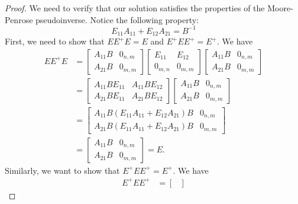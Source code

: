 \documentclass{article}
\theoremstyle{plain}
\theoremstyle{definition}
\theoremstyle{remark}
\theoremstyle{remark}
\begin{document}
  \begin{proof}
    We need to verify that our solution satisfies the properties of the Moore-Penrose pseudoinverse. Notice the following property: 
    \begin{equation}
      E_{11}A_{11}+E_{12}A_{21} = B^{-1}
    \end{equation}
    First, we need to show that $E E^{+} E = E$ and $E^{+} E E^{+} = E^{+}$. We have
    \begin{align}
      EE^{+}E &= 
      \begin{bmatrix} 
        A_{11} B & 0_{n,m} \\ 
        A_{21} B & 0_{m,m} 
      \end{bmatrix} 
      \begin{bmatrix} 
        E_{11} & E_{12} \\ 
        0_{m,n} & 0_{m,m} 
      \end{bmatrix} 
      \begin{bmatrix} 
        A_{11} B & 0_{n,m} \\ 
        A_{21} B & 0_{m,m} 
      \end{bmatrix}  \nonumber \\
      &= 
      \begin{bmatrix} 
        A_{11} B E_{11} & A_{11} B E_{12} \\
        A_{21} B E_{11} & A_{21}BE_{12} 
      \end{bmatrix} 
      \begin{bmatrix} 
        A_{11} B & 0_{n,m} \\
        A_{21} B & 0_{m,m} 
      \end{bmatrix} \nonumber \\
      &= 
      \begin{bmatrix} 
        A_{11} B (E_{11} A_{11} + E_{12} A_{21}) B & 0_{n,m} \\ 
        A_{21} B (E_{11} A_{11} + E_{12} A_{21}) B & 0_{m,m} 
      \end{bmatrix} \nonumber \\
      &= 
      \begin{bmatrix} A_{11} B & 0_{n,m} \\ 
        A_{21} B & 0_{m,m} 
      \end{bmatrix} = E.
    \end{align}
    Similarly, we want to show that $E^{+} E E^{+} = E^{+}$. We have
    \begin{align}
      E^{+} E E^{+} &= 
      \begin{bmatrix} 

\end{bmatrix}
\end{align}
\end{proof}
\end{document}
